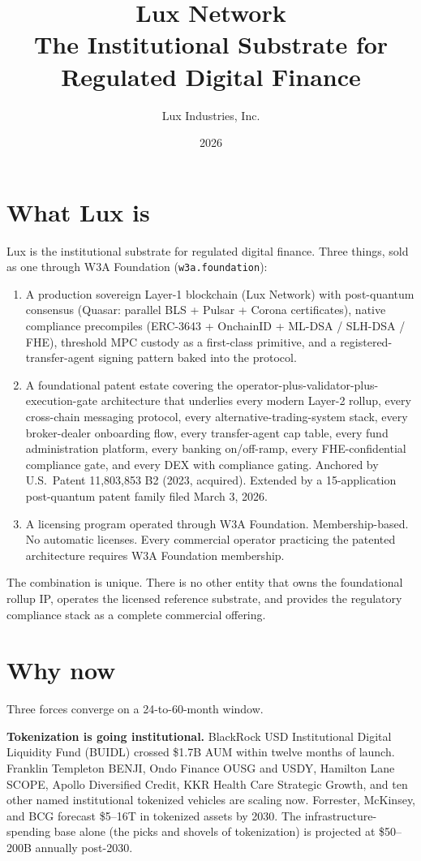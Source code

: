 \documentclass[11pt,letterpaper]{article}
\title{Lux Network\\The Institutional Substrate for Regulated Digital Finance}
\author{Lux Industries, Inc.}
\date{2026}
\begin{document}
\luxcoverpage

\section*{What Lux is}

Lux is the institutional substrate for regulated digital finance. Three things, sold as one through W3A Foundation (\texttt{w3a.foundation}):

\begin{enumerate}
\item A production sovereign Layer-1 blockchain (Lux Network) with post-quantum consensus (Quasar: parallel BLS + Pulsar + Corona certificates), native compliance precompiles (ERC-3643 + OnchainID + ML-DSA / SLH-DSA / FHE), threshold MPC custody as a first-class primitive, and a registered-transfer-agent signing pattern baked into the protocol.
\item A foundational patent estate covering the operator-plus-validator-plus-execution-gate architecture that underlies every modern Layer-2 rollup, every cross-chain messaging protocol, every alternative-trading-system stack, every broker-dealer onboarding flow, every transfer-agent cap table, every fund administration platform, every banking on/off-ramp, every FHE-confidential compliance gate, and every DEX with compliance gating. Anchored by U.S.\ Patent 11,803,853 B2 (2023, acquired). Extended by a 15-application post-quantum patent family filed March 3, 2026.
\item A licensing program operated through W3A Foundation. Membership-based. No automatic licenses. Every commercial operator practicing the patented architecture requires W3A Foundation membership.
\end{enumerate}

The combination is unique. There is no other entity that owns the foundational rollup IP, operates the licensed reference substrate, and provides the regulatory compliance stack as a complete commercial offering.

\section*{Why now}

Three forces converge on a 24-to-60-month window.

\textbf{Tokenization is going institutional.} BlackRock USD Institutional Digital Liquidity Fund (BUIDL) crossed \$1.7B AUM within twelve months of launch. Franklin Templeton BENJI, Ondo Finance OUSG and USDY, Hamilton Lane SCOPE, Apollo Diversified Credit, KKR Health Care Strategic Growth, and ten other named institutional tokenized vehicles are scaling now. Forrester, McKinsey, and BCG forecast \$5--16T in tokenized assets by 2030. The infrastructure-spending base alone (the picks and shovels of tokenization) is projected at \$50--200B annually post-2030.
\end{document}
